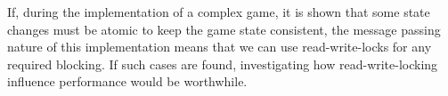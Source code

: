 If, during the implementation of a complex game, it is shown that some
state changes must be atomic to keep the game state consistent, the
message passing nature of this implementation means that we can use
read-write-locks for any required blocking. If such cases are found,
investigating how read-write-locking influence performance would be
worthwhile.
%
